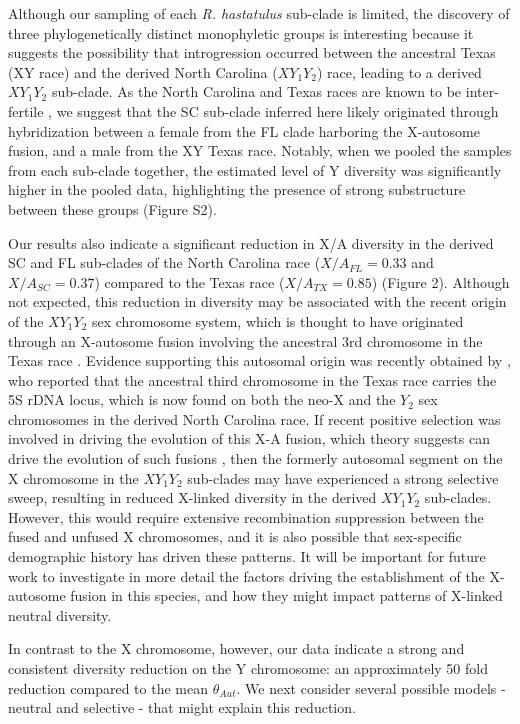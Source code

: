 \documentclass[9pt,twocolumn,twoside]{gsajnl}
\begin{document}
Although our sampling of each \textit{R. hastatulus} sub-clade is limited, the discovery of three phylogenetically distinct monophyletic groups is interesting because it suggests the possibility that introgression occurred between the ancestral Texas (XY race) and the derived North Carolina ($XY_{1}Y_{2}$) race, leading to a derived $XY_{1}Y_{2}$ sub-clade. As the North Carolina and Texas races are known to be inter-fertile \citep{smith1964evolving}, we suggest that the SC sub-clade inferred here likely originated through hybridization between a female from the FL clade harboring the X-autosome fusion, and a male from the XY Texas race. Notably, when we pooled the samples from each sub-clade together, the estimated level of Y diversity was significantly higher in the pooled data, highlighting the presence of strong substructure between these groups (Figure S2).

Our results also indicate a significant reduction in X/A diversity in the derived SC and FL sub-clades of the North Carolina race ($X/A_{FL}=0.33$ and $X/A_{SC}=0.37$) compared to the Texas race ($X/A_{TX}=0.85$) (Figure 2). Although not expected, this reduction in diversity may be associated with the recent origin of the $XY_{1}Y_{2}$ sex chromosome system, which is thought to have originated through an X-autosome fusion involving the ancestral 3rd chromosome in the Texas race \citep{smith1964evolving}. Evidence supporting this autosomal origin was recently obtained by \citep{grabowska2015}, who reported that the ancestral third chromosome in the Texas race carries the 5S rDNA locus, which is now found on both the neo-X and the $Y_{2}$ sex chromosomes in the derived North Carolina race. If recent positive selection was involved in driving the evolution of this X-A fusion, which theory suggests can drive the evolution of such fusions \citep{charlesworth1980sex}, then the formerly autosomal segment on the X chromosome in the $XY_{1}Y_{2}$ sub-clades may have experienced a strong selective sweep, resulting in reduced X-linked diversity in the derived $XY_{1}Y_{2}$ sub-clades. However, this would require extensive recombination suppression between the fused and unfused X chromosomes, and it is also possible that sex-specific demographic history has driven these patterns. It will be important for future work to investigate in more detail the factors driving the establishment of the X-autosome fusion in this species, and how they might impact patterns of X-linked neutral diversity.

In contrast to the X chromosome, however, our data indicate a strong and consistent diversity reduction on the Y chromosome: an approximately 50 fold reduction compared to the mean $\theta_{Aut}$. We next consider several possible models - neutral and selective - that might explain this reduction.
\end{document}
